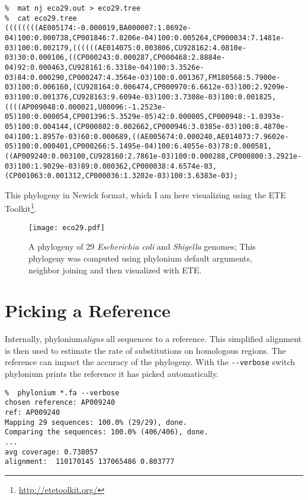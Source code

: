 \documentclass[a4paper,10pt,english]{scrartcl}
\newcommand{\tool}[1]{\textsf{#1}}
\newcommand{\phylonium}{\textsf{phylonium}\xspace}
\begin{document}
\begin{lstlisting}
%  mat nj eco29.out > eco29.tree
%  cat eco29.tree
((((((((AE005174:-0.000019,BA000007:1.8692e-04)100:0.000738,CP001846:7.8206e-04)100:0.005264,CP000034:7.1481e-03)100:0.002179,((((((AE014075:0.003806,CU928162:4.0810e-03)30:0.000106,((CP000243:0.000287,CP000468:2.8884e-04)92:0.000463,CU928161:6.3318e-04)100:3.3526e-03)84:0.000290,CP000247:4.3564e-03)100:0.001367,FM180568:5.7900e-03)100:0.006160,(CU928164:0.006474,CP000970:6.6612e-03)100:2.9209e-03)100:0.001376,CU928163:9.6094e-03)100:3.7308e-03)100:0.001825,((((AP009048:0.000021,U00096:-1.2523e-05)100:0.000054,CP001396:5.3529e-05)42:0.000005,CP000948:-1.0393e-05)100:0.004144,(CP000802:0.002662,CP000946:3.0385e-03)100:8.4870e-04)100:1.8957e-03)60:0.000689,((AE005674:0.000240,AE014073:7.9602e-05)100:0.000401,CP000266:5.1495e-04)100:6.4055e-03)78:0.000581,((AP009240:0.003100,CU928160:2.7861e-03)100:0.000288,CP000800:3.2921e-03)100:1.9029e-03)89:0.000362,CP000038:4.6574e-03,(CP001063:0.001312,CP000036:1.3202e-03)100:3.6383e-03);
\end{lstlisting}

This phylogeny in Newick format, which I am here visualizing using the ETE Toolkit\footnote{\url{http://etetoolkit.org/}}.

\begin{figure}
  \begin{center}
    \texttt{[image: eco29.pdf]}
  \end{center}
  \caption{A phylogeny of 29 \textit{Escherichia coli} and \textit{Shigella} genomes; This phylogeny was computed using \tool{phylonium} default arguments, neighbor joining and then visualized with ETE.}
\end{figure}


\section{Picking a Reference}

Internally, \phylonium \emph{aligns} all sequences to a reference. This simplified alignment is then used to estimate the rate of substitutions on homologous regions. The reference can  impact the accuracy of the phylogeny. With the \lstinline!--verbose! switch \phylonium prints the reference it has picked automatically.

\begin{lstlisting}
%  phylonium *.fa --verbose
chosen reference: AP009240
ref: AP009240
Mapping 29 sequences: 100.0% (29/29), done.
Comparing the sequences: 100.0% (406/406), done.
...
avg coverage: 0.738057
alignment:  110170145 137065486 0.803777
\end{lstlisting}
\end{document}
